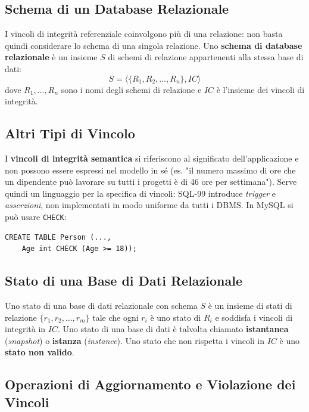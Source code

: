 \documentclass[12pt, a4paper]{article}
\begin{document}
\subsection{Schema di un Database Relazionale}

I vincoli di integrità referenziale coinvolgono più di una relazione: non basta quindi considerare lo schema di una singola relazione. Uno \textbf{schema di database relazionale} è un insieme $S$ di schemi di relazione appartenenti alla stessa base di dati:
$$S = \langle \{R_1, R_2, \ldots, R_n\}, IC \rangle$$
dove $R_1, \ldots, R_n$ sono i nomi degli schemi di relazione e $IC$ è l'insieme dei vincoli di integrità.

\subsection{Altri Tipi di Vincolo}

I \textbf{vincoli di integrità semantica} si riferiscono al significato dell'applicazione e non possono essere espressi nel modello in sé (es. "il numero massimo di ore che un dipendente può lavorare su tutti i progetti è di 46 ore per settimana"). Serve quindi un linguaggio per la specifica di vincoli: SQL-99 introduce \textit{trigger} e \textit{asserzioni}, non implementati in modo uniforme da tutti i DBMS. In MySQL si può usare \texttt{CHECK}:
\begin{verbatim}
CREATE TABLE Person (...,
    Age int CHECK (Age >= 18));
\end{verbatim}

\subsection{Stato di una Base di Dati Relazionale}

Uno stato di una base di dati relazionale con schema $S$ è un insieme di stati di relazione $\{r_1, r_2, \ldots, r_m\}$ tale che ogni $r_i$ è uno stato di $R_i$ e soddisfa i vincoli di integrità in $IC$. Uno stato di una base di dati è talvolta chiamato \textbf{istantanea} (\textit{snapshot}) o \textbf{istanza} (\textit{instance}). Uno stato che non rispetta i vincoli in $IC$ è uno \textbf{stato non valido}.

\subsection{Operazioni di Aggiornamento e Violazione dei Vincoli}
\end{document}

